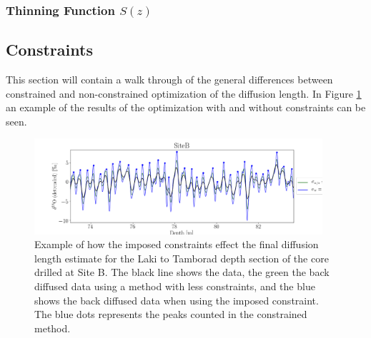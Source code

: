 \documentclass[../../CompleteThesis2/Complete_2ndDraft]{subfiles}
\begin{document}
\subsubsection{Thinning Function $S(z)$}
\label{Subsubsec:Method_SigmaMethod_SigmaCorrections_ThinningFct}



\subsection[Constraints][Constraints]{Constraints}
\label{Subsec:Method_SigmaMethod_Constraints}
This section will contain a walk through of the general differences between constrained and non-constrained optimization of the diffusion length. In Figure \ref{fig:SiteB_ConstVNoConst} an example of the results of the optimization with and without constraints can be seen.
\begin{figure}[h]
	\centering
	\includegraphics[width=0.95\textwidth]{SiteB_ConstVNoConst.png}
	\caption[Site B Constrained vs. Unconstrained]{\small Example of how the imposed constraints effect the final diffusion length estimate for the Laki to Tamborad depth section of the core drilled at Site B. The black line shows the data, the green the back diffused data using a method with less constraints, and the blue shows the back diffused data when using the imposed constraint. The blue dots represents the peaks counted in the constrained method.}
	\label{fig:SiteB_ConstVNoConst}
\end{figure}



\end{document}
